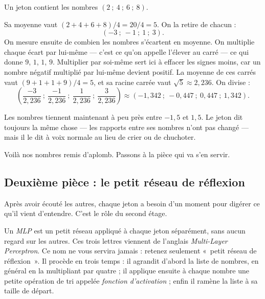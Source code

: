 \begin{exemple}
Un jeton contient les nombres $(2 \ ; \ 4 \ ; \ 6 \ ; \ 8)$.

Sa moyenne vaut $(2+4+6+8)/4 = 20/4 = 5$. On la retire de chacun :
\[ (-3 \ ; \ -1 \ ; \ 1 \ ; \ 3). \]
On mesure ensuite de combien les nombres s'écartent en moyenne. On multiplie
chaque écart par lui-même — c'est ce qu'on appelle l'élever au carré — ce
qui donne $9$, $1$, $1$, $9$. Multiplier par soi-même sert ici à effacer les
signes moins, car un nombre négatif multiplié par lui-même devient positif.
La moyenne de ces carrés vaut $(9+1+1+9)/4 = 5$, et sa racine carrée vaut
$\sqrt{5} \approx 2{,}236$. On divise :
\[
  \left( \frac{-3}{2{,}236} \ ; \ \frac{-1}{2{,}236} \ ; \
         \frac{1}{2{,}236} \ ; \ \frac{3}{2{,}236} \right)
  \approx (-1{,}342 \ ; \ -0{,}447 \ ; \ 0{,}447 \ ; \ 1{,}342).
\]

Les nombres tiennent maintenant à peu près entre $-1{,}5$ et $1{,}5$. Le
jeton dit toujours la même chose — les rapports entre ses nombres n'ont pas
changé — mais il le dit à voix normale au lieu de crier ou de chuchoter.
\end{exemple}

Voilà nos nombres remis d'aplomb. Passons à la pièce qui va s'en servir.

\subsection*{Deuxième pièce : le petit réseau de réflexion}

Après avoir écouté les autres, chaque jeton a besoin d'un moment pour
digérer ce qu'il vient d'entendre. C'est le rôle du second étage.

\begin{definition}[Le MLP][mlp]
Un \emph{MLP} est un petit réseau appliqué à chaque jeton séparément, sans
aucun regard sur les autres. Ces trois lettres viennent de l'anglais
\emph{Multi-Layer Perceptron}. Ce nom ne vous servira jamais : retenez
seulement «~petit réseau de réflexion~». Il procède en
trois temps : il agrandit d'abord la liste de nombres, en général en la
multipliant par quatre ; il applique ensuite à chaque nombre une petite
opération de tri appelée \emph{fonction d'activation} ; enfin il ramène la
liste à sa taille de départ.
\end{definition}

